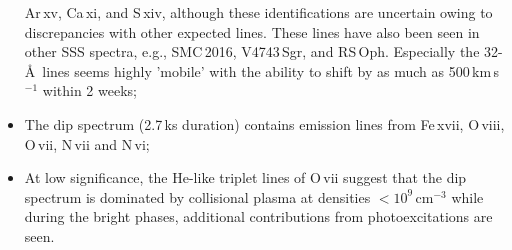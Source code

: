 \documentclass{aa}
\begin{document}
\begin{itemize}
   Ar\,{\sc xv}, Ca\,{\sc xi}, and S\,{\sc xiv}, although these identifications are
   uncertain owing to discrepancies with other expected lines.
   These lines have also been seen in other SSS spectra, e.g., SMC\,2016, V4743\,Sgr,
   and RS\,Oph. Especially the 32-\AA\ lines seems highly 'mobile' with the ability to
   shift by as much as 500\,km\,s$^{-1}$ within 2 weeks;
 \item The dip spectrum (2.7\,ks duration) contains emission lines from Fe\,{\sc xvii},
   O\,{\sc viii}, O\,{\sc vii}, N\,{\sc vii} and N\,{\sc vi};
 \item At low significance, the He-like triplet lines of O\,{\sc vii} suggest that the
   dip spectrum is dominated by collisional plasma at densities $<10^9$\,cm$^{-3}$ while
   during the bright phases, additional contributions from photoexcitations are seen.
\end{itemize}
\end{document}
